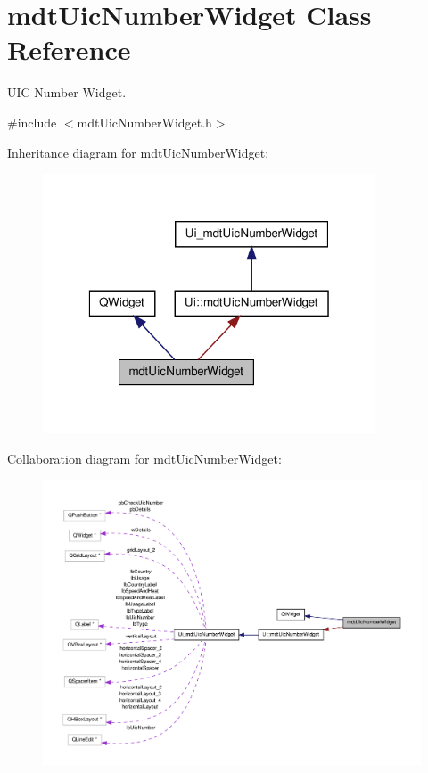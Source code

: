 \hypertarget{classmdt_uic_number_widget}{\section{mdt\-Uic\-Number\-Widget Class Reference}
\label{classmdt_uic_number_widget}
}


U\-I\-C Number Widget.  




{\ttfamily \#include $<$mdt\-Uic\-Number\-Widget.\-h$>$}



Inheritance diagram for mdt\-Uic\-Number\-Widget\-:
\nopagebreak
\begin{figure}[H]
\begin{center}
\leavevmode
\includegraphics[width=280pt]{classmdt_uic_number_widget__inherit__graph}
\end{center}
\end{figure}


Collaboration diagram for mdt\-Uic\-Number\-Widget\-:
\nopagebreak
\begin{figure}[H]
\begin{center}
\leavevmode
\includegraphics[width=350pt]{classmdt_uic_number_widget__coll__graph}
\end{center}
\end{figure}
